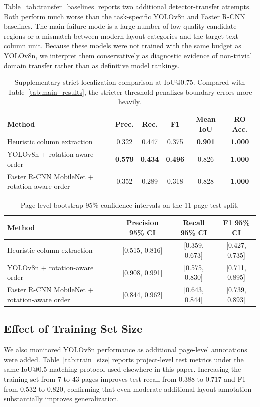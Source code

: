 \documentclass[pdflatex,sn-mathphys-num]{sn-jnl}
\begin{document}
Table~\ref{tab:transfer_baselines} reports two additional detector-transfer attempts. Both perform much worse than the task-specific YOLOv8n and Faster R-CNN baselines. The main failure mode is a large number of low-quality candidate regions or a mismatch between modern layout categories and the target text-column unit. Because these models were not trained with the same budget as YOLOv8n, we interpret them conservatively as diagnostic evidence of non-trivial domain transfer rather than as definitive model rankings.


\begin{table}
\centering
\scriptsize\setlength{\tabcolsep}{3pt}
\caption{Supplementary strict-localization comparison at IoU@0.75. Compared with Table~\ref{tab:main_results}, the stricter threshold penalizes boundary errors more heavily.}
\label{tab:iou75}
\begin{tabular}{lccccc}
\toprule
Method & Prec. & Rec. & F1 & Mean IoU & RO Acc. \\
\midrule
Heuristic column extraction & 0.322 & 0.447 & 0.375 & \textbf{0.901} & \textbf{1.000} \\
YOLOv8n + rotation-aware order & \textbf{0.579} & \textbf{0.434} & \textbf{0.496} & 0.826 & \textbf{1.000} \\
Faster R-CNN MobileNet + rotation-aware order & 0.352 & 0.289 & 0.318 & 0.828 & \textbf{1.000} \\
\bottomrule
\end{tabular}
\end{table}


\begin{table}
\centering
\scriptsize\setlength{\tabcolsep}{3pt}
\caption{Page-level bootstrap 95\% confidence intervals on the 11-page test split.}
\label{tab:bootstrap_ci}
\begin{tabular}{lccc}
\toprule
Method & Precision 95\% CI & Recall 95\% CI & F1 95\% CI \\
\midrule
Heuristic column extraction & [0.515, 0.816] & [0.359, 0.673] & [0.427, 0.735] \\
YOLOv8n + rotation-aware order & [0.908, 0.991] & [0.575, 0.830] & [0.711, 0.895] \\
Faster R-CNN MobileNet + rotation-aware order & [0.844, 0.962] & [0.643, 0.844] & [0.739, 0.893] \\
\bottomrule
\end{tabular}
\end{table}


\subsection{Effect of Training Set Size}
We also monitored YOLOv8n performance as additional page-level annotations were added. Table~\ref{tab:train_size} reports project-level test metrics under the same IoU@0.5 matching protocol used elsewhere in this paper. Increasing the training set from 7 to 43 pages improves test recall from 0.388 to 0.717 and F1 from 0.532 to 0.820, confirming that even moderate additional layout annotation substantially improves generalization.
\end{document}
